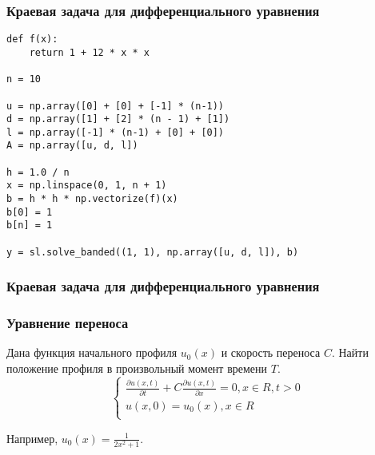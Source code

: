 \documentclass[10pt]{beamer}
\begin{document}
\begin{frame}[fragile]
\frametitle{Краевая задача для дифференциального уравнения}
\begin{lstlisting}
def f(x):
	return 1 + 12 * x * x

n = 10

u = np.array([0] + [0] + [-1] * (n-1))
d = np.array([1] + [2] * (n - 1) + [1])
l = np.array([-1] * (n-1) + [0] + [0])
A = np.array([u, d, l])

h = 1.0 / n
x = np.linspace(0, 1, n + 1)
b = h * h * np.vectorize(f)(x)
b[0] = 1
b[n] = 1

y = sl.solve_banded((1, 1), np.array([u, d, l]), b)
\end{lstlisting}
\end{frame}


\begin{frame}[fragile]
\frametitle{Краевая задача для дифференциального уравнения}

\begin{center}
\end{center}

\end{frame}

\begin{frame}[fragile]
\frametitle{Уравнение переноса}
Дана функция начального профиля $u_0(x)$ и скорость переноса $C$. Найти положение профиля в произвольный момент времени $T$.
$$
\begin{cases} 
\frac{\partial u(x,t)}{\partial t} + C \frac{\partial u(x,t)}{\partial x} = 0, x \in R, t > 0\\
u(x, 0) = u_0(x), x \in R\\
\end{cases}
$$

Например, $u_0(x) = \frac{1}{2 x^2 + 1}$.
\begin{center}
\end{center}
\end{frame}
\end{document}
